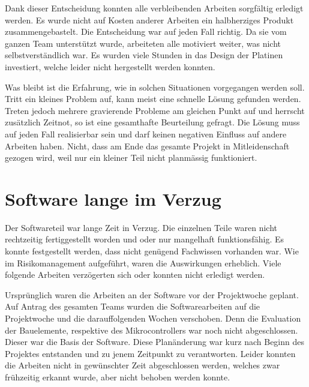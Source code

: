 Dank  dieser Entscheidung  konnten  alle  verbleibenden Arbeiten  sorgf\"altig
erledigt werden. Es wurde  nicht auf Kosten anderer  Arbeiten ein halbherziges
Produkt zusammengebastelt. Die Entscheidung war auf jeden Fall richtig. Da sie
vom ganzen  Team unterst\"utzt  wurde, arbeiteten  alle motiviert  weiter, was
nicht  selbstverst\"andlich war. Es  wurden viele  Stunden in  das Design  der
Platinen investiert, welche leider nicht hergestellt werden konnten.

Was bleibt  ist die Erfahrung,  wie in solchen Situationen  vorgegangen werden
soll. Tritt  ein  kleines  Problem  auf, kann  meist  eine  schnelle  L\"osung
gefunden werden. Treten jedoch mehrere  gravierende Probleme am gleichen Punkt
auf und  herrscht zus\"atzlich  Zeitnot, so  ist eine  gesamthafte Beurteilung
gefragt. Die L\"osung  muss auf jeden  Fall realisierbar sein und  darf keinen
negativen Einfluss auf andere Arbeiten  haben. Nicht, dass am Ende das gesamte
Projekt  in Mitleidenschaft  gezogen wird,  weil  nur ein  kleiner Teil  nicht
planm\"assig funktioniert.


\section{Software lange im Verzug}
\label{sec:softwareBehind}

Der Softwareteil  war lange  Zeit in Verzug. Die  einzelnen Teile  waren nicht
rechtzeitig fertiggestellt worden und oder nur mangelhaft funktionsf\"ahig. Es
konnte  festgestellt  werden,  dass   nicht  gen\"ugend  Fachwissen  vorhanden
war. Wie im  Risikomanagement aufgef\"uhrt, waren die  Auswirkungen erheblich.
Viele folgende Arbeiten verz\"ogerten sich oder konnten nicht erledigt werden.

Urspr\"unglich  waren  die  Arbeiten  an der  Software  vor  der  Projektwoche
geplant. Auf  Antrag  des  gesamten  Teams  wurden  die  Softwarearbeiten  auf
die  Projektwoche   und  die   darauffolgenden  Wochen   verschoben. Denn  die
Evaluation  der Bauelemente,  respektive des  Mikrocontrollers war  noch nicht
abgeschlossen. Dieser  war   die  Basis  der   Software. Diese  Plan\"anderung
war  kurz  nach  Beginn  des  Projektes  entstanden  und  zu  jenem  Zeitpunkt
zu  verantworten. Leider  konnten die  Arbeiten  nicht  in gew\"unschter  Zeit
abgeschlossen  werden, welches  zwar  fr\"uhzeitig erkannt  wurde, aber  nicht
behoben werden konnte.

